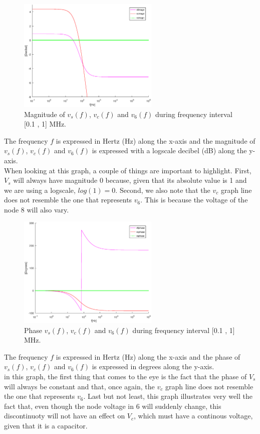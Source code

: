\begin{figure}[H] \centering
\includegraphics[width=0.6\textwidth]{magnitude.eps}
\caption{Magnitude of $v_s(f)$,  $v_c(f)$  and $v_6(f)$ during frequency interval [0.1 , 1] MHz.}
\label{fig:magnitudetheo}
\end{figure}

The frequency $f$ is expressed in Hertz (Hz) along the x-axis and 
the magnitude of $v_s(f)$,  $v_c(f)$  and $v_6(f)$ is expressed with a logscale decibel (dB) along the y-axis.\\
When looking at this graph, a couple of things are important to highlight. First, $V_s$ will always have magnitude 0 because, given that its absolute value is 1 and we are using a logscale, $log(1)=0$. Second, we also note that the $v_c$ graph line does not resemble the one that represents $v_6$. This is because the voltage of the node 8 will also vary. 


\begin{figure}[H] \centering
\includegraphics[width=0.6\textwidth]{phase.eps}
\caption{Phase $v_s(f)$,  $v_c(f)$  and $v_6(f)$ during frequency interval [0.1 , 1] MHz.}
\label{fig:phasetheo}
\end{figure}

The frequency $f$ is expressed in Hertz (Hz) along the x-axis and
the phase of $v_s(f)$,  $v_c(f)$  and $v_6(f)$ is expressed in degrees along the y-axis.\\
in this graph, the first thing that comes to the eye is the fact that the phase of $V_s$ will always be constant and that, once again, the $v_c$ graph line does not resemble the one that represents $v_6$. Last but not least, this graph illustrates very well the fact that, even though the node voltage in 6 will suddenly change, this discontinuoty will not have an effect on $V_c$, which must have a continous voltage, given that it is a capacitor.

